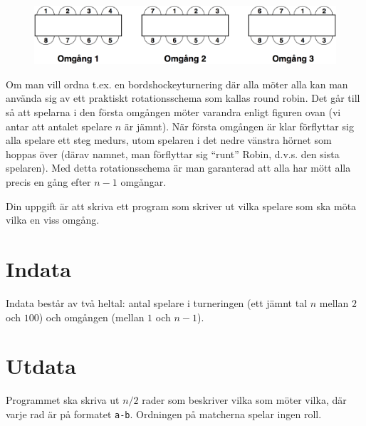 
\begin{figure}[h!]
  \centering
  \includegraphics{turnering.png}
\end{figure}

Om man vill ordna t.ex. en bordshockeyturnering där alla möter alla kan man använda sig av ett praktiskt rotationsschema som kallas round robin.
Det går till så att spelarna i den första omgången möter varandra enligt figuren ovan (vi antar att antalet spelare $n$ är jämnt).
När första omgången är klar förflyttar sig alla spelare ett steg medurs, utom spelaren i det nedre vänstra hörnet som hoppas över (därav namnet, man förflyttar sig ``runt'' Robin, d.v.s. den sista spelaren).
Med detta rotationsschema är man garanterad att alla har mött alla precis en gång efter $n-1$ omgångar.

Din uppgift är att skriva ett program som skriver ut vilka spelare som ska möta vilka en viss omgång.

\section*{Indata}
Indata består av två heltal: antal spelare i turneringen (ett jämnt tal $n$ mellan $2$ och $100$) och omgången (mellan $1$ och $n-1$).

\section*{Utdata}
Programmet ska skriva ut $n/2$ rader som beskriver vilka som möter vilka, där varje rad är på formatet \texttt{a-b}.
Ordningen på matcherna spelar ingen roll.
